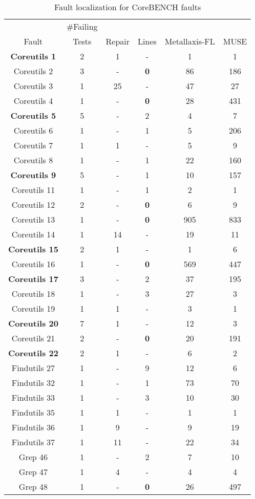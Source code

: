 \begin{table}
\centering
{\scriptsize
\begin{tabular}{|c|c||c|c||c|c|}
\hline
& \#Failing & & & & \\
Fault & Tests & Repair & Lines & Metallaxis-FL & MUSE\\
\hline
{\bf Coreutils 1} & 2 & 1 & - & 1 & 1 \\
Coreutils 2 & 3 & - &  {\bf 0} & 86 & 186 \\
Coreutils 3 & 1 & 25 & - & 47 & 27 \\
Coreutils 4 & 1 & - &  {\bf 0} & 28 & 431 \\
{\bf Coreutils 5} & 5 & - &  2 & 4 & 7 \\
Coreutils 6 & 1 & - &  1 & 5 & 206 \\
Coreutils 7 & 1 & 1 & - & 5 & 9 \\
Coreutils 8 & 1 & - &  1 & 22 & 160 \\
{\bf Coreutils 9} & 5 & - &  1 & 10 & 157 \\
Coreutils 11 & 1 & - &  1 & 2 & 1 \\
Coreutils 12 & 2 & - & {\bf 0} & 6 & 9 \\
Coreutils 13 & 1 & - & {\bf 0} & 905 & 833 \\
Coreutils 14 & 1 & 14 & - & 19 & 11 \\
{\bf Coreutils 15} & 2 & 1 & - & 1 & 6 \\
Coreutils 16 & 1 & - & {\bf 0} & 569 & 447 \\
{\bf Coreutils 17} & 3 & - &  2 & 37 & 195 \\
Coreutils 18 & 1 & - &  3 & 27 & 3 \\
Coreutils 19 & 1 & 1 & - & 3 & 1 \\
{\bf Coreutils 20} & 7 & 1 & - & 12 & 3 \\
Coreutils 21 & 2 & - & {\bf 0} & 20 & 191 \\
{\bf Coreutils 22} & 2 & 1 & - & 6 & 2 \\
Findutils 27 & 1 & - &  9 & 12 & 6 \\
Findutils 32 & 1 & - &  1 & 73 & 70 \\
Findutils 33 & 1 & - &  3 & 10 & 30 \\
Findutils 35 & 1 & 1 & - & 1 & 1 \\
Findutils 36 & 1 & 9 & - & 9 & 19 \\
Findutils 37 & 1 & 11 & - & 22 & 34 \\
Grep 46 & 1 & - &  2 & 7 & 10 \\
Grep 47 & 1 & 4 & - & 4 & 4 \\
Grep 48 & 1 & - & {\bf 0} & 26 & 497 \\

\hline
\end{tabular}
}
\caption{Fault localization for CoreBENCH faults}
\label{otherbugs}
\end{table}